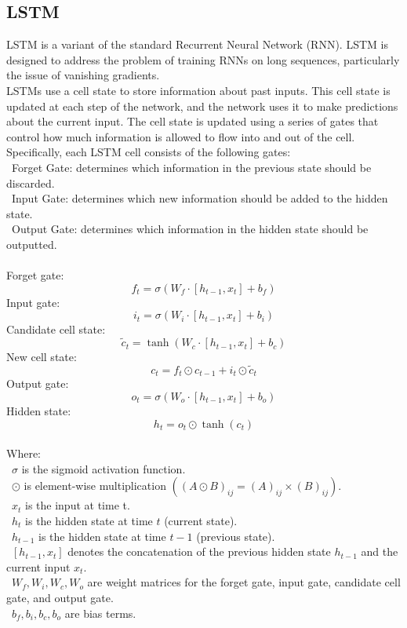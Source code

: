 \documentclass{ieeeojies}
\begin{document}
\subsection{LSTM}
LSTM \cite{b8} is a variant of the standard Recurrent Neural Network (RNN). LSTM is designed to address the problem of training RNNs on long sequences, particularly the issue of vanishing gradients.\\
LSTMs use a cell state to store information about past inputs. This cell state is updated at each step of the network, and the network uses it to make predictions about the current input. The cell state is updated using a series of gates that control how much information is allowed to flow into and out of the cell.\\
Specifically, each LSTM cell consists of the following gates:\\
    \indent\textbullet\ Forget Gate: determines which information in the previous state should be discarded.\\
    \indent\textbullet\ Input Gate: determines which new information should be added to the hidden state.\\
    \indent\textbullet\ Output Gate: determines which information in the hidden state should be outputted.\\
\\
Forget gate:
    \[f_t = \sigma(W_f \cdot [h_{t-1}, x_t] + b_f)\]
Input gate:
    \[i_t = \sigma(W_i \cdot [h_{t-1}, x_t] + b_i)\]
Candidate cell state:
    \[\tilde{c}_t = \tanh(W_c \cdot [h_{t-1}, x_t] + b_c)\]
New cell state:
    \[c_t = f_t \odot c_{t-1} + i_t \odot \tilde{c}_t\]
Output gate:
    \[o_t = \sigma(W_o \cdot [h_{t-1}, x_t] + b_o)\]
Hidden state:
    \[h_t = o_t \odot \tanh(c_t)\]
\\
Where:\\
    \indent\ \(\sigma\) is the sigmoid activation function.\\
    \indent\ \(\odot\) is element-wise multiplication \(((A \odot B)_{ij} = (A)_{ij} \times (B)_{ij})\).\\
    \indent\ \(x_t\) is the input at time t.\\
    \indent\ \(h_t\) is the hidden state at time \(t\) (current state).\\
    \indent\ \(h_{t-1}\) is the hidden state at time \(t-1\) (previous state).\\
    \indent\ \([h_{t-1}, x_t]\) denotes the concatenation of the previous hidden state \(h_{t-1}\) and the current input \(x_t\).\\
    \indent\ \(W_f, W_i, W_c, W_o\) are weight matrices for the forget gate, input gate, candidate cell gate, and output gate.\\
    \indent\ \(b_f, b_i, b_c, b_o\) are bias terms.
\end{document}
